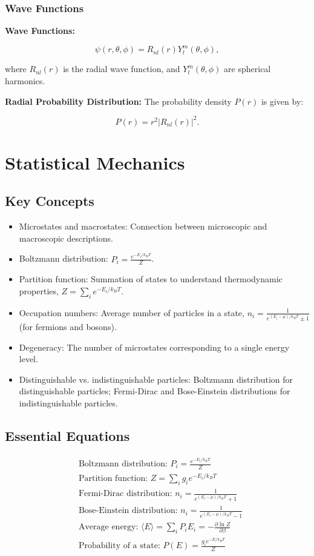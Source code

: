 \documentclass{article}
\newcommand{\eqbox}[1]{\begin{tcolorbox}[colback=gray!10] #1 \end{tcolorbox}}
\newcommand{\conceptbox}[1]{\begin{tcolorbox}[colback=blue!10] #1 \end{tcolorbox}}
\begin{document}
\subsubsection{Wave Functions}
\conceptbox{
\textbf{Wave Functions:}
\eqbox{
\[
\psi(r, \theta, \phi) = R_{nl}(r)Y_l^m(\theta, \phi),
\]}
where \( R_{nl}(r) \) is the radial wave function, and \( Y_l^m(\theta, \phi) \) are spherical harmonics.

\textbf{Radial Probability Distribution:}
The probability density \( P(r) \) is given by:
\eqbox{
\[
P(r) = r^2|R_{nl}(r)|^2.
\]}
}

\section{Statistical Mechanics}

\subsection{Key Concepts}
\conceptbox{
\begin{itemize}
    \item Microstates and macrostates: Connection between microscopic and macroscopic descriptions.
    \item Boltzmann distribution: $P_i = \frac{e^{-E_i/k_BT}}{Z}$.
    \item Partition function: Summation of states to understand thermodynamic properties, $Z = \sum_i e^{-E_i/k_BT}$.
    \item Occupation numbers: Average number of particles in a state, $n_i = \frac{1}{e^{(E_i-\mu)/k_BT} \pm 1}$ (for fermions and bosons).
    \item Degeneracy: The number of microstates corresponding to a single energy level.
    \item Distinguishable vs. indistinguishable particles: Boltzmann distribution for distinguishable particles; Fermi-Dirac and Bose-Einstein distributions for indistinguishable particles.
\end{itemize}
}

\subsection{Essential Equations}
\eqbox{
\begin{align*}
    &\text{Boltzmann distribution: } P_i = \frac{e^{-E_i/k_BT}}{Z} \\
    &\text{Partition function: } Z = \sum_i g_i e^{-E_i/k_BT} \\
    &\text{Fermi-Dirac distribution: } n_i = \frac{1}{e^{(E_i-\mu)/k_BT} + 1} \\
    &\text{Bose-Einstein distribution: } n_i = \frac{1}{e^{(E_i-\mu)/k_BT} - 1} \\
    &\text{Average energy: } \langle E \rangle = \sum_i P_i E_i = -\frac{\partial \ln Z}{\partial \beta} \\
    &\text{Probability of a state: } P(E) = \frac{g_i e^{-E/k_BT}}{Z}
\end{align*}
}
\end{document}
